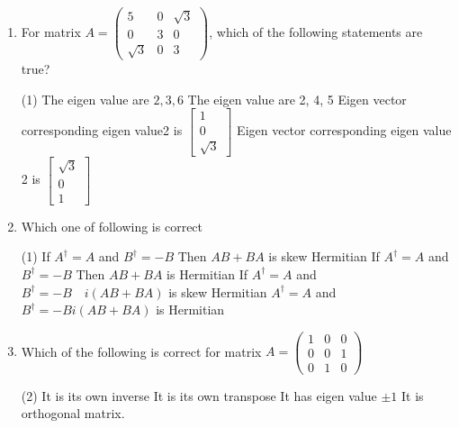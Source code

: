 \begin{enumerate}
\begin{tasks}
                	\task[\textbf{d.}] The eigen vector corresponding to nondegenerate eigen value is $\left[\begin{array}{l}1 \\ 1 \\ 0\end{array}\right]$
                \end{tasks}
  \item For matrix $A=\left(\begin{array}{ccc}5 & 0 & \sqrt{3} \\ 0 & 3 & 0 \\ \sqrt{3} & 0 & 3\end{array}\right)$, which of the following statements are true?
  \begin{tasks}(1)
 	\task[\textbf{a.}]The eigen value are $2,3,6$
 	\task[\textbf{b.}]The eigen value are 2, 4, 5
 	\task[\textbf{c.}]Eigen vector corresponding eigen value2 is $\left[\begin{array}{c}1 \\ 0 \\ \sqrt{3}\end{array}\right]$
 	\task[\textbf{d.}] Eigen vector corresponding eigen value 2 is $\left[\begin{array}{c}\sqrt{3} \\ 0 \\ 1\end{array}\right]$
 \end{tasks}               
 \item  Which one of following is correct 
   \begin{tasks}(1)
  	\task[\textbf{a.}] If $A^{\dagger}=A$ and $B^{\dagger}=-B$ Then $A B+B A$ is skew Hermitian
  	\task[\textbf{b.}] If $A^{\dagger}=A$ and $B^{\dagger}=-B$ Then $A B+B A$ is Hermitian
  	\task[\textbf{c.}]If $A^{\dagger}=A$ and $B^{\dagger}=-B \quad i(A B+B A)$ is skew Hermitian
  	\task[\textbf{d.}] $A^{\dagger}=A$ and $B^{\dagger}=-B i(A B+B A)$ is Hermitian    
  \end{tasks}              
\item  Which of the following is correct for matrix $A=\left(\begin{array}{lll}1 & 0 & 0 \\ 0 & 0 & 1 \\ 0 & 1 & 0\end{array}\right)$             
   \begin{tasks}(2)
  	\task[\textbf{a.}] It is its own inverse
  	\task[\textbf{b.}]It is its own transpose
  	\task[\textbf{c.}] It has eigen value $\pm 1$
  	\task[\textbf{d.}]  It is orthogonal matrix.
  \end{tasks}              

\end{enumerate}
